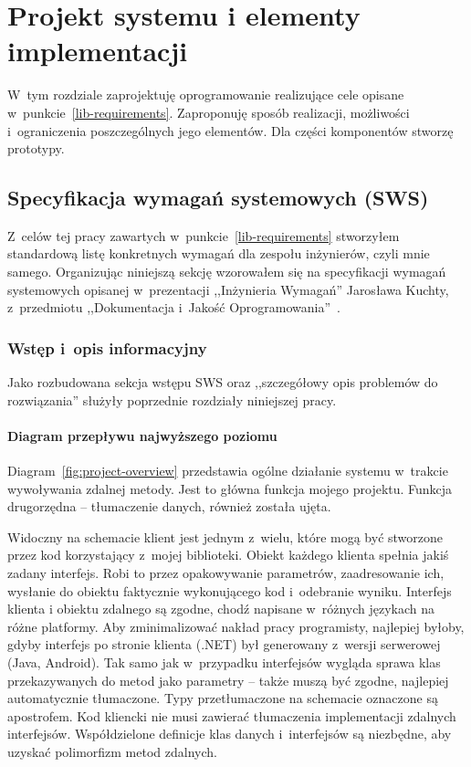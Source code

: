 \chapter{Projekt systemu i elementy implementacji}
W~tym rozdziale zaprojektuję oprogramowanie realizujące cele opisane w~punkcie~\ref{lib-requirements}.
Zaproponuję sposób realizacji, możliwości i~ograniczenia poszczególnych jego elementów. Dla części komponentów stworzę prototypy.

\section{Specyfikacja wymagań systemowych (SWS)}
Z~celów tej pracy zawartych w~punkcie~\ref{lib-requirements} stworzyłem standardową listę konkretnych wymagań dla zespołu inżynierów, czyli mnie samego.
Organizując niniejszą sekcję wzorowałem się na specyfikacji wymagań systemowych opisanej w~prezentacji ,,Inżynieria Wymagań'' Jarosława Kuchty, z~przedmiotu ,,Dokumentacja i~Jakość Oprogramowania''~\cite{kuchta}.


\subsection{Wstęp i~opis informacyjny}
Jako rozbudowana sekcja wstępu SWS oraz ,,szczegółowy opis problemów do rozwiązania'' służyły poprzednie rozdziały niniejszej pracy.


\subsubsection{Diagram przepływu najwyższego poziomu}
Diagram~\ref{fig:project-overview} przedstawia ogólne działanie systemu w~trakcie wywoływania zdalnej metody. Jest to główna funkcja mojego projektu. Funkcja drugorzędna -- tłumaczenie danych, również została ujęta.


Widoczny na schemacie klient jest jednym z~wielu, które mogą być stworzone przez kod korzystający z~mojej biblioteki.
Obiekt każdego klienta spełnia jakiś zadany interfejs. Robi to przez opakowywanie parametrów, zaadresowanie ich, wysłanie do obiektu faktycznie wykonującego kod i~odebranie wyniku.
Interfejs klienta i obiektu zdalnego są zgodne, chodź napisane w~różnych językach na różne platformy. Aby zminimalizować nakład pracy programisty, najlepiej byłoby, gdyby interfejs po stronie klienta (.NET) był generowany z~wersji serwerowej (Java, Android).
Tak samo jak w~przypadku interfejsów wygląda sprawa klas przekazywanych do metod jako parametry -- także muszą być zgodne, najlepiej automatycznie tłumaczone.
Typy przetłumaczone na schemacie oznaczone są apostrofem.
Kod kliencki nie musi zawierać tłumaczenia implementacji zdalnych interfejsów.
Współdzielone definicje klas danych i~interfejsów są niezbędne, aby uzyskać polimorfizm metod zdalnych.

